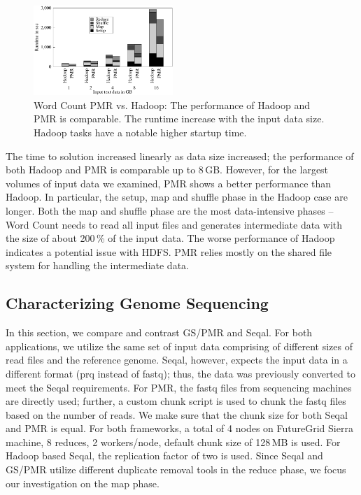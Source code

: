\documentclass[12pt]{report}
\newcommand{\upp}{\vspace*{-0.5em}}
\begin{document}
\begin{figure}[ht]
	\centering
		\includegraphics[width=0.47\textwidth]{figures/wc_pmr_hmr.pdf}
                \caption{Word Count PMR vs. Hadoop: The performance of
                  Hadoop and PMR is comparable. The runtime increase
                  with the input data size. Hadoop tasks have a
                  notable higher startup time.\upp}
\label{fig:figures_wc_pmr_hmr}
\end{figure}		
	
The time to solution increased linearly as data size increased; the
performance of both Hadoop and PMR is comparable up to 8\,GB. However,
for the largest volumes of input data we examined, PMR shows a better
performance than Hadoop. In particular, the setup, map and shuffle phase in the 
Hadoop case are longer. Both the map and shuffle phase are the most  
data-intensive phases -- Word Count needs to read all input files and generates 
intermediate data with the size of about 200\,\% of the input data. The worse 
performance of Hadoop indicates a potential issue with HDFS. PMR relies mostly 
on the shared file system for handling the intermediate data.


\upp\upp
\subsection{Characterizing Genome Sequencing}

In this section, we compare and contrast GS/PMR and Seqal. For both
applications, we utilize the same set of input data comprising of different
sizes of read files and the reference genome. Seqal, however, expects the input
data in a different format (prq instead of fastq); thus, the data was previously
converted to meet the Seqal requirements. For PMR, the fastq files from
sequencing machines are directly used; further, a custom chunk script is used to
chunk the fastq files based on the number of reads. We make sure that the chunk
size for both Seqal and PMR is equal. For both frameworks, a total of 4 nodes on
FutureGrid Sierra machine, 8 reduces, 2 workers/node, default chunk size of
128\,MB is used. For Hadoop based Seqal, the replication factor of two is used.
Since Seqal and GS/PMR utilize different duplicate removal tools in the reduce
phase, we focus our investigation on the map phase.
\end{document}
